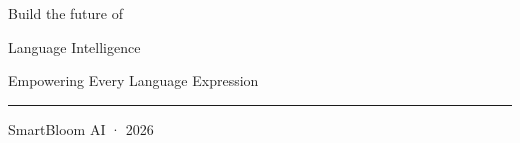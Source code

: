\begin{frame}[plain]
\vspace*{2.15cm}
\begin{center}
{\SBFontTitle\color{SBText}\fontsize{36}{43}\selectfont Build the future of}\par\vspace{0.2cm}
{\SBFontTitle\color{SBPrimary}\fontsize{42}{49}\selectfont Language Intelligence}\par\vspace{0.55cm}
{\SBFontBody\color{SBMuted}\fontsize{15}{21}\selectfont Empowering Every Language Expression}\par\vspace{0.8cm}
{\color{SBPrimary}\rule{3.2cm}{1.6pt}}\par\vspace{0.35cm}
{\SBFontBody\color{SBGray}\fontsize{11}{15}\selectfont SmartBloom AI · 2026}
\end{center}
\end{frame}
